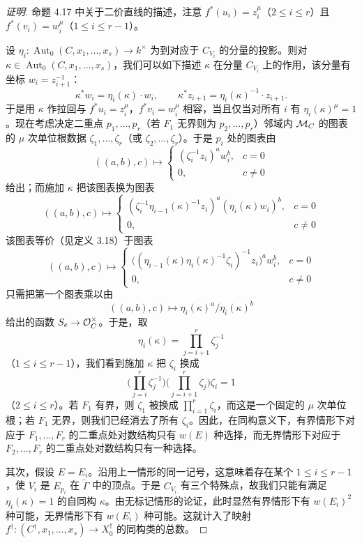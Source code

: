 \begin{proof}[证明]
命题 4.17 中关于二价直线的描述，注意 $f^*(u_i)=z_i^\mu$（$2\le i\le r$）且 $f^*(v_i)=w_i^\mu$（$1\le i\le r-1$）。

设 $\eta_i:\operatorname{Aut}_0(C,x_1,\dots,x_s)\to k^\times$ 为到对应于 $C_{V_i}$ 的分量的投影。则对 $\kappa\in\operatorname{Aut}_0(C,x_1,\dots,x_s)$，我们可以如下描述 $\kappa$ 在分量 $C_{V_i}$ 上的作用，该分量有坐标 $w_i=z_{i+1}^{-1}$：
\[
\kappa^*w_i=\eta_i(\kappa)\cdot w_i,\qquad\kappa^*z_{i+1}=\eta_i(\kappa)^{-1}\cdot z_{i+1}.
\]
于是用 $\kappa$ 作拉回与 $f^*u_i=z_i^\mu$，$f^*v_i=w_i^\mu$ 相容，当且仅当对所有 $i$ 有 $\eta_i(\kappa)^\mu=1$。现在考虑决定二重点 $p_1,\dots,p_r$（若 $F_1$ 无界则为 $p_2,\dots,p_r$）邻域内 $\mathcal{M}_C$ 的图表的 $\mu$ 次单位根数据 $\zeta_1,\dots,\zeta_r$（或 $\zeta_2,\dots,\zeta_r$）。于是 $p_i$ 处的图表由
\[
((a,b),c)\mapsto\begin{cases}(\zeta_i^{-1}z_i)^aw_i^b,&c=0\\ 0,&c\ne0\end{cases}
\]
给出；而施加 $\kappa$ 把该图表换为图表
\[
((a,b),c)\mapsto\begin{cases}(\zeta_i^{-1}\eta_{i-1}(\kappa)^{-1}z_i)^a(\eta_i(\kappa)w_i)^b,&c=0\\ 0,&c\ne0\end{cases}
\]
该图表等价（见定义 3.18）于图表
\[
((a,b),c)\mapsto\begin{cases}\big((\eta_{i-1}(\kappa)\eta_i(\kappa)^{-1}\zeta_i)^{-1}z_i\big)^aw_i^b,&c=0\\ 0,&c\ne0\end{cases}
\]
只需把第一个图表乘以由
\[
((a,b),c)\mapsto\eta_i(\kappa)^a/\eta_i(\kappa)^b
\]
给出的函数 $S_e\to\mathcal{O}_C^\times$。于是，取
\[
\eta_i(\kappa)=\prod_{j=i+1}^r\zeta_j^{-1}
\]
（$1\le i\le r-1$），我们看到施加 $\kappa$ 把 $\zeta_i$ 换成
\[
\Big(\prod_{j=i}^r\zeta_j^{-1}\Big)\Big(\prod_{j=i+1}^r\zeta_j\Big)\zeta_i=1
\]
（$2\le i\le r$）。若 $F_1$ 有界，则 $\zeta_1$ 被换成 $\prod_{i=1}^r\zeta_i$，而这是一个固定的 $\mu$ 次单位根；若 $F_1$ 无界，则我们已经消去了所有 $\zeta_i$。因此，在同构意义下，有界情形下对应于 $F_1,\dots,F_r$ 的二重点处对数结构只有 $w(E)$ 种选择，而无界情形下对应于 $F_2,\dots,F_r$ 的二重点处对数结构只有一种选择。

其次，假设 $E=E_i$。沿用上一情形的同一记号，这意味着存在某个 $1\le i\le r-1$，使 $V_i$ 是 $E_{p_i}$ 在 $\tilde\Gamma$ 中的顶点。于是 $C_{V_i}$ 有三个特殊点，故我们只能有满足 $\eta_i(\kappa)=1$ 的自同构 $\kappa$。由无标记情形的论证，此时显然有界情形下有 $w(E_i)^2$ 种可能，无界情形下有 $w(E_i)$ 种可能。这就计入了映射 $f^\dagger:(C^\dagger,x_1,\dots,x_s)\to X_0^\dagger$ 的同构类的总数。
\end{proof}

